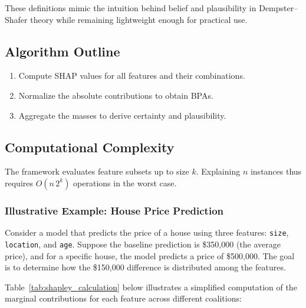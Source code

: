 \documentclass[acmlarge]{acmart}
\begin{document}
These definitions mimic the intuition behind belief and plausibility in Dempster--Shafer theory while remaining lightweight enough for practical use.

\subsection{Algorithm Outline}
\begin{enumerate}
    \item Compute SHAP values for all features and their combinations.
    \item Normalize the absolute contributions to obtain BPAs.
    \item Aggregate the masses to derive certainty and plausibility.
\end{enumerate}
\subsection{Computational Complexity}
The framework evaluates feature subsets up to size $k$. Explaining $n$ instances thus requires $O(n\,2^k)$ operations in the worst case.
\subsubsection{Illustrative Example: House Price Prediction}

Consider a model that predicts the price of a house using three features: \texttt{size}, \texttt{location}, and \texttt{age}. Suppose the baseline prediction is \$350,000 (the average price), and for a specific house, the model predicts a price of \$500,000. The goal is to determine how the \$150,000 difference is distributed among the features.

Table~\ref{tab:shapley_calculation} below illustrates a simplified computation of the marginal contributions for each feature across different coalitions:
\end{document}
